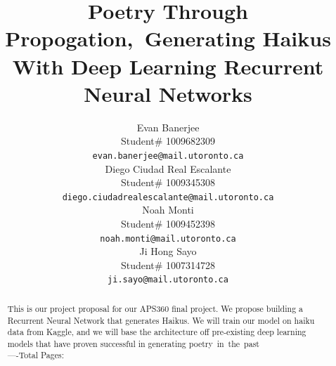 \documentclass{article} %
\title{Poetry Through Propogation,\ Generating Haikus With Deep Learning Recurrent Neural Networks}
\author{Evan Banerjee  \\
Student\# 1009682309\\
\texttt{evan.banerjee@mail.utoronto.ca} \\
\And
Diego Ciudad Real Escalante  \\
Student\# 1009345308 \\
\texttt{diego.ciudadrealescalante@mail.utoronto.ca} \\
\AND
Noah Monti  \\
Student\# 1009452398 \\
\texttt{noah.monti@mail.utoronto.ca} \\
\And
Ji Hong Sayo \\
Student\# 1007314728 \\
\texttt{ji.sayo@mail.utoronto.ca} \\
}
\begin{document}
\maketitle

\begin{abstract}
This is our project proposal for our APS360 final project. We propose building a Recurrent Neural Network that generates Haikus. We will train our model on haiku data from Kaggle, and we will base the architecture off pre-existing deep learning models that have proven successful in generating poetry in the past\\%
----Total Pages: \pageref{last_page}
\end{abstract}










\end{document}
